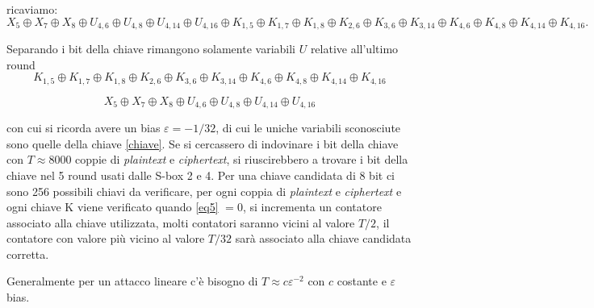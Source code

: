 ricaviamo:
\[
    X_5 \oplus X_7 \oplus X_8 \oplus U_{4,6} \oplus U_{4,8} \oplus U_{4,14} \oplus U_{4,16} \oplus K_{1,5} \oplus K_{1,7} \oplus K_{1,8} \oplus K_{2,6} \oplus K_{3,6} \oplus K_{3,14} \oplus K_{4,6} \oplus K_{4,8} \oplus K_{4,14} \oplus K_{4,16}.
\]

Separando i bit della chiave rimangono solamente variabili $U$ relative all'ultimo round 
\begin{equation}
    \label{chiave}
    K_{1,5} \oplus K_{1,7} \oplus K_{1,8} \oplus K_{2,6} \oplus K_{3,6} \oplus K_{3,14} \oplus K_{4,6} \oplus K_{4,8} \oplus K_{4,14} \oplus K_{4,16} 
\end{equation}

\begin{equation}
    \label{eq5}
    X_{5} \oplus X_{7} \oplus X_{8} \oplus U_{4,6} \oplus U_{4,8} \oplus U_{4,14} \oplus U_{4,16} 
\end{equation}


con cui si ricorda avere un bias $\varepsilon = -1/32$, di cui le uniche variabili sconosciute sono quelle della chiave \ref{chiave}. Se si cercassero di indovinare i bit della chiave con $T \approx 8000$ coppie di \emph{plaintext} e \emph{ciphertext}, si riuscirebbero a trovare i bit della chiave nel 5 round usati dalle S-box 2 e 4. Per una chiave candidata di 8 bit ci sono 256 possibili chiavi da verificare, per ogni coppia di \emph{plaintext} e \emph{ciphertext} e ogni chiave K viene verificato quando \ref{eq5} $= 0$, si incrementa un contatore associato alla chiave utilizzata, molti contatori saranno vicini al valore $T/2$, il contatore con valore più vicino al valore $T/32$ sarà associato alla chiave candidata corretta.

Generalmente per un attacco lineare c'è bisogno di $T \approx c \varepsilon^{-2}$ con $c$ costante e $\varepsilon$ bias.
